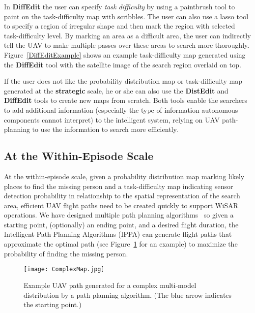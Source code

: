 In \textbf{DiffEdit} the user can specify \textit{task difficulty} by using a paintbrush tool to paint on the task-difficulty map with scribbles. The user can also use a lasso tool to specify a region of irregular shape and then mark the region with selected task-difficulty level. By marking an area as a difficult area, the user can indirectly tell the UAV to make multiple passes over these areas to search more thoroughly. Figure~\ref{DiffEditExample} shows an example task-difficulty map generated using the \textbf{DiffEdit} tool with the satellite image of the search region overlaid on top.

If the user does not like the probability distribution map or task-difficulty map generated at the \textbf{strategic} scale, he or she can also use the \textbf{DistEdit} and \textbf{DiffEdit} tools to create new maps from scratch. Both tools enable the searchers to add additional information (especially the type of information autonomous components cannot interpret) to the intelligent system, relying on UAV path-planning to use the information to search more efficiently.

\subsection{At the Within-Episode Scale}

At the within-episode scale, given a probability distribution map marking likely places to find the missing person and a task-difficulty map indicating sensor detection probability in relationship to the spatial representation of the search area, efficient UAV flight paths need to be created quickly to support WiSAR operations. We have designed multiple path planning algorithms~\cite{Lin2009UAV,Lin2014Hierarchical} so given a starting point, (optionally) an ending point, and a desired flight duration, the Intelligent Path Planning Algorithms (IPPA) can generate flight paths that approximate the optimal path (see Figure~\ref{path} for an example) to maximize the probability of finding the missing person.

\begin{figure}
\centering
\texttt{[image: ComplexMap.jpg]}
\caption{Example UAV path generated for a complex multi-model distribution by a path planning algorithm. (The blue arrow indicates the starting point.)}
\label{path}
\end{figure}

